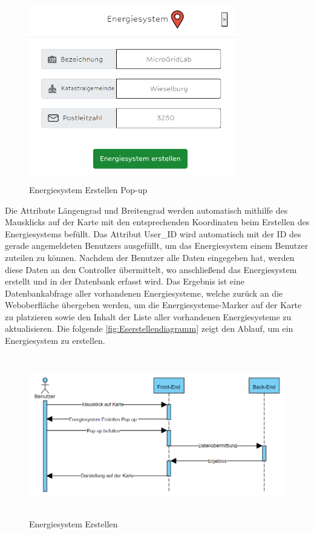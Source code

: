\begin{figure}[h]
	\centering
	\includegraphics[height=8cm,width=9cm]{images/ESerstellenPop}
	\caption{Energiesystem Erstellen Pop-up}
	\label{fig:ESerstellenPopup}
\end{figure}
\newpage
Die Attribute Längengrad und Breitengrad werden automatisch mithilfe des Mausklicks auf der Karte mit den entsprechenden Koordinaten beim Erstellen des Energiesystems befüllt. Das Attribut User\_ID wird automatisch mit der ID des gerade angemeldeten Benutzers ausgefüllt, um das Energiesystem einem Benutzer zuteilen zu können.
\newline
Nachdem der Benutzer alle Daten eingegeben hat, werden diese Daten an den Controller übermittelt, wo anschließend das Energiesystem erstellt und in der Datenbank erfasst wird. Das Ergebnis ist eine Datenbankabfrage aller vorhandenen Energiesysteme, welche zurück an die Weboberfläche übergeben werden, um die Energiesysteme-Marker auf der Karte zu platzieren sowie den Inhalt der Liste aller vorhandenen Energiesysteme zu aktualisieren.  
Die folgende \autoref{fig:Eserstellendiagramm} zeigt den Ablauf, um ein Energiesystem zu erstellen.

\begin{figure}[h]
	\centering
	\includegraphics[height=7cm,width=14cm]{images/ESerstellen}
	\caption{Energiesystem Erstellen}
	\label{fig:Eserstellendiagramm}
\end{figure}





